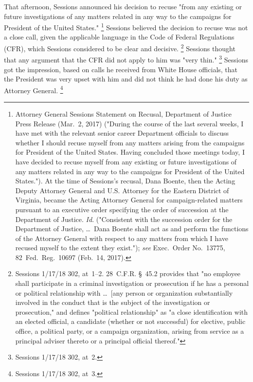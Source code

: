 That afternoon, Sessions announced his decision to recuse "from any existing or future investigations of any matters related in any way to the campaigns for President of the United States."%
\footnote{Attorney General Sessions Statement on Recusal, Department of Justice Press Release (Mar.~2, 2017) ("During the course of the last several weeks, I have met with the relevant senior career Department officials to discuss whether I should recuse myself from any matters arising from the campaigns for President of the United States.
Having concluded those meetings today, I have decided to recuse myself from any existing or future investigations of any matters related in any way to the campaigns for President of the United States.").
At the time of Sessions's recusal, Dana Boente, then the Acting Deputy Attorney General and U.S. Attorney for the Eastern District of Virginia, became the Acting Attorney General for campaign-related matters pursuant to an executive order specifying the order of succession at the Department of Justice.
\textit{Id}. ("Consistent with the succession order for the Department of Justice, \dots\ Dana Boente shall act as and perform the functions of the Attorney General with respect to any matters from which I have recused myself to the extent they exist.");
\textit{see} Exec.\ Order No.~13775, 82~Fed.\ Reg.\ 10697 (Feb.~14, 2017).}
Sessions believed the decision to recuse was not a close call, given the applicable language in the Code of Federal Regulations (CFR), which Sessions considered to be clear and decisive.%
\footnote{Sessions 1/17/18 302, at~1--2. 28~C.F.R. \S~45.2 provides that "no employee shall participate in a criminal investigation or prosecution if he has a personal or political relationship with \dots\ [any person or organization substantially involved in the conduct that is the subject of the investigation or prosecution," and defines "political relationship" as "a close identification with an elected official, a candidate (whether or not successful) for elective, public office, a political party, or a campaign organization, arising from service as a principal adviser thereto or a principal official thereof."}
Sessions thought that any argument that the CFR did not apply to him was "very thin."%
\footnote{Sessions 1/17/18 302, at~2.}
Sessions got the impression, based on calls he received from White House officials, that the President was very upset with him and did not think he had done his duty as Attorney General.%
\footnote{Sessions 1/17/18 302, at~3.}

